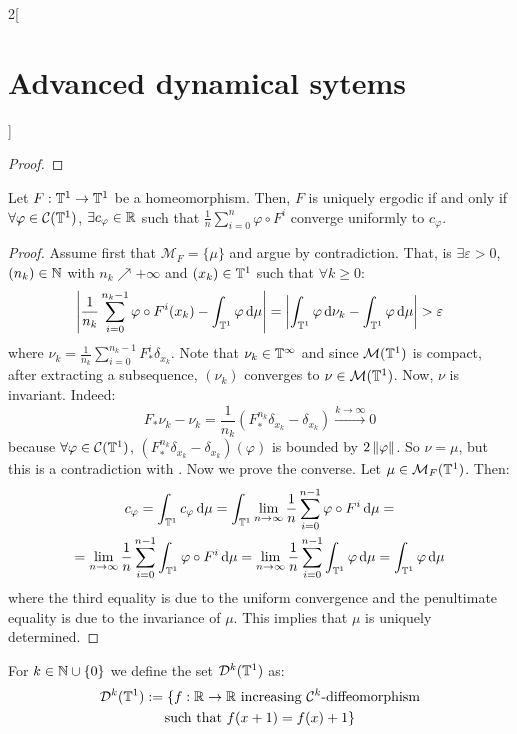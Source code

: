 \documentclass[../../../main_math.tex]{subfiles}
\begin{document}
\begin{multicols}{2}[\section{Advanced dynamical sytems}]
\begin{proof}
  \end{proof}
  \begin{proposition}\label{ADS:birkov_sum_converge}
    Let $F:\mathbb{T}^1\to\mathbb{T}^1$ be a homeomorphism. Then, $F$ is uniquely ergodic if and only if $\forall \varphi\in\mathcal{C}(\mathbb{T}^1)$, $\exists c_\varphi\in\mathbb{R}$ such that $\frac{1}{n}\sum_{i=0}^n\varphi\circ F^i$ converge uniformly to $c_\varphi$.
  \end{proposition}
  \begin{proof}
    Assume first that $\mathcal{M}_F=\{\mu\}$ and argue by contradiction. That, is $\exists \varepsilon>0$, $(n_k)\in\mathbb{N}$ with $n_k\nearrow +\infty$ and $(x_k)\in\mathbb{T}^1$ such that $\forall k\geq 0$:
    \begin{equation}\label{ADS:nuk_mu}
      \abs{\frac{1}{n_k}\sum_{i=0}^{n_k-1}\varphi\circ F^i(x_k)-\int_{\mathbb{T}^1}\varphi\dd{\mu}}=\abs{\int_{\mathbb{T}^1}\varphi\dd{\nu_k}-\int_{\mathbb{T}^1}\varphi\dd{\mu}}>\varepsilon
    \end{equation}
    $$
    $$
    where $\nu_k=\frac{1}{n_k}\sum_{i=0}^{n_k-1}F_*^i\delta_{x_k}$. Note that $\nu_k\in\mathcal{\mathbb{T}^1}$ and since $\mathcal{M}(\mathbb{T}^1)$ is compact, after extracting a subsequence, $(\nu_k)$ converges to $\nu\in\mathcal{M}(\mathbb{T}^1)$. Now, $\nu$ is invariant. Indeed:
    $$
      F_*\nu_k-\nu_k=\frac{1}{n_k}(F_*^{n_k}\delta_{x_k}-\delta_{x_k})\overset{k\to\infty}{\longrightarrow} 0
    $$
    because $\forall \varphi\in\mathcal{C}(\mathbb{T}^1)$, $(F_*^{n_k}\delta_{x_k}-\delta_{x_k})(\varphi)$ is bounded by $2\left\|\varphi\right\|$. So $\nu =\mu$, but this is a contradiction with . Now we prove the converse. Let $\mu\in\mathcal{M}_F(\mathbb{T}^1)$. Then:
    \begin{multline*}
      c_\varphi =\int_{\mathbb{T}^1}c_\varphi\dd{\mu} =\int_{\mathbb{T}^1}\lim_{n\to\infty}\frac{1}{n}\sum_{i=0}^{n-1}\varphi\circ F^i\dd{\mu} =\\
      =\lim_{n\to\infty}\frac{1}{n}\sum_{i=0}^{n-1}\int_{\mathbb{T}^1}\varphi\circ F^i\dd{\mu}=\lim_{n\to\infty}\frac{1}{n}\sum_{i=0}^{n-1}\int_{\mathbb{T}^1}\varphi\dd{\mu} =\int_{\mathbb{T}^1}\varphi\dd{\mu}
    \end{multline*}
    where the third equality is due to the uniform convergence and the penultimate equality is due to the invariance of $\mu$. This implies that $\mu$ is uniquely determined.
  \end{proof}
  \begin{definition}
    For $k\in\mathbb{N}\cup\{0\}$ we define the set $\mathcal{D}^k(\mathbb{T}^1)$ as:
    \begin{multline*}
      \mathcal{D}^k(\TT^1):=\{f:\RR\to\RR \text{ increasing $\mathcal{C}^k$-diffeomorphism}\\\text{such that }f(x+1)=f(x)+1\}

\end{multline*}
\end{definition}
\end{multicols}
\end{document}
